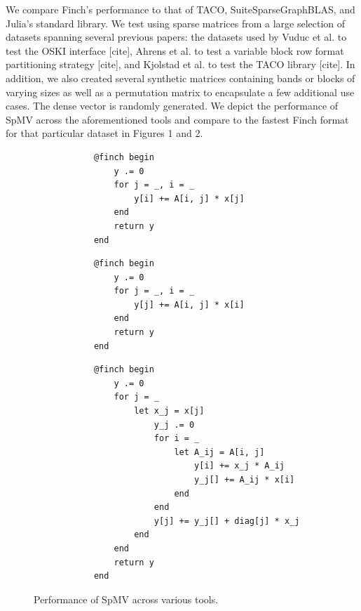 We compare Finch’s performance to that of TACO, SuiteSparseGraphBLAS, and Julia’s standard library.  We test using sparse matrices from a large selection of datasets spanning several previous papers: the datasets used by Vuduc et al. to test the OSKI interface [cite], Ahrens et al. to test a variable block row format partitioning strategy [cite], and Kjolstad et al. to test the TACO library [cite]. In addition, we also created several synthetic matrices containing bands or blocks of varying sizes as well as a permutation matrix to encapsulate a few additional use cases. The dense vector is randomly generated. We depict the performance of SpMV across the aforementioned tools and compare to the fastest Finch format for that particular dataset in Figures 1 and 2. 

\begin{figure}
    \begin{minipage}[t]{0.315\textwidth}
        \vspace{0pt} %
        \begin{verbatim}
            @finch begin
                y .= 0
                for j = _, i = _
                    y[i] += A[i, j] * x[j]
                end
                return y
            end
        \end{verbatim}
    \end{minipage}%
    \begin{minipage}[t]{0.315\textwidth}
        \vspace{0pt} %
        \begin{verbatim}
            @finch begin
                y .= 0
                for j = _, i = _
                    y[j] += A[i, j] * x[i]
                end
                return y
            end
        \end{verbatim}
    \end{minipage}
    \begin{minipage}[t]{0.36\textwidth}
        \vspace{0pt} %
        \begin{verbatim}
            @finch begin
                y .= 0
                for j = _
                    let x_j = x[j]
                        y_j .= 0
                        for i = _
                            let A_ij = A[i, j]
                                y[i] += x_j * A_ij
                                y_j[] += A_ij * x[i]
                            end
                        end
                        y[j] += y_j[] + diag[j] * x_j
                    end
                end
                return y
            end
        \end{verbatim}
    \end{minipage}
    \caption{Performance of SpMV across various tools.}
\end{figure}

